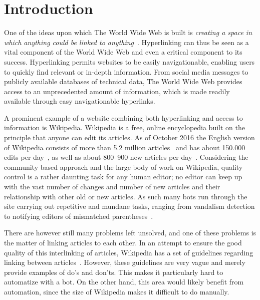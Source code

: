 \chapter{Introduction}
\label{ch:introduction}
One of the ideas upon which The World Wide Web is built is \emph{creating a space in which anything could be linked to anything}~\cite[ch.~1, p.~4]{Weaving-the-web}. Hyperlinking can thus be seen as a vital component of the World Wide Web and even a critical component to its success. Hyperlinking permits websites to be easily navigationable, enabling users to quickly find relevant or in-depth information. From social media messages to publicly available databases of technical data, The World Wide Web provides access to an unprecedented amount of information, which is made readily available through easy navigationable hyperlinks.

A prominent example of a website combining both hyperlinking and access to information is Wikipedia. Wikipedia is a free, online encyclopedia built on the principle that anyone can edit its articles. As of October 2016 the English version of Wikipedia consists of more than 5.2 million articles~\cite{wiki-about} and has about 150.000 edits per day~\cite{wiki-num-edits}, as well as about 800--900 new articles per day~\cite{wmcharts}. Considering the community based approach and the large body of work on Wikipedia, quality control is a rather daunting task for any human editor; no editor can keep up with the vast number of changes and number of new articles and their relationship with other old or new articles. As such many bots run through the site carrying out repetitive and mundane tasks, ranging from vandalism detection to notifying editors of mismatched parentheses~\cite{wiki-bots}.

There are however still many problems left unsolved, and one of these problems is the matter of linking articles to each other. In an attempt to ensure the good quality of this interlinking of articles, Wikipedia has a set of guidelines regarding linking between articles~\cite{wiki-manual-of-style-overlinking}. However, these guidelines are very vague and merely provide examples of do's and don'ts. %
This makes it particularly hard to automatize with a bot. On the other hand, this area would likely benefit from automation, since the size of Wikipedia makes it difficult to do manually.

